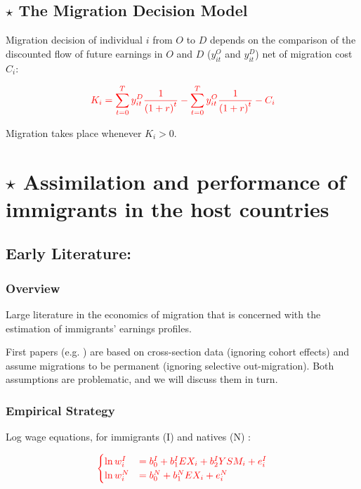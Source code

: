     \subsection{$\star$ The Migration Decision Model}

        Migration decision of individual $i$ from $O$ to $D$ depends on the comparison of the discounted flow of future earnings in $O$ and $D$ ($y_{it}^O$ and $y_{it}^D$) net of migration cost $C_i$:
        
        \[\color{red} K_i = \sum_{t=0}^{T} y_{it}^D \frac{1}{{(1+r)}^t} - \sum_{t=0}^{T} y_{it}^O \frac{1}{{(1+r)}^t} - C_i\]

        Migration takes place whenever $K_i>0$.


\section{$\star$ Assimilation and performance of immigrants in the host countries}

    \subsection{Early Literature: \cite{chiswick_effect_1978}}

        \subsubsection{Overview}

            Large literature in the economics of migration that is concerned with the estimation of immigrants’ earnings profiles.
            
            First papers (e.g. \cite{chiswick_effect_1978}) are based on cross-section data (ignoring cohort effects) and assume migrations to be permanent (ignoring selective out-migration). Both assumptions are problematic, and we will discuss them in turn.

        \subsubsection{Empirical Strategy}

            Log wage equations, for immigrants (I) and natives (N) :

            \begin{equation*}
                \color{red}
                \begin{cases}
                    \ln w_{i}^I  & = b_{0}^I+b_{1}^IEX_{i} + b_{2}^IYSM_{i} + e_{i}^I \\
                    \ln w_{i}^N  & = b_{0}^N+b_{1}^NEX_{i}+e_{i}^N
                \end{cases}
            \end{equation*}


